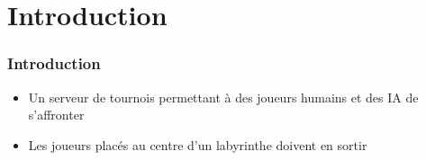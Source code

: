 \section{Introduction}

    \begin{frame}
        \frametitle{Introduction}

			\begin{itemize}
				\item Un serveur de tournois permettant à des joueurs humains et des IA de s'affronter
				\vspace{20px}
				\item Les joueurs placés au centre d'un labyrinthe doivent en sortir
			\end{itemize}

    \end{frame}
